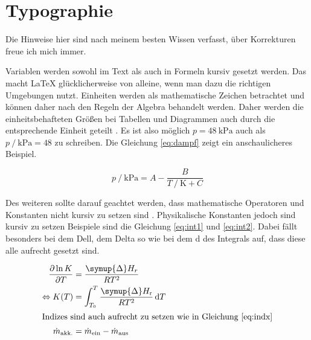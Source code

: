 	
\section{Typographie}\label{sec:typ}
Die Hinweise hier sind nach meinem besten Wissen verfasst, über Korrekturen freue ich mich immer.

Variablen werden sowohl im Text als auch in Formeln kursiv gesetzt werden.
Das macht \LaTeX{} glücklicherweise von alleine, wenn man dazu die richtigen Umgebungen nutzt.
Einheiten werden als mathematische Zeichen betrachtet und können daher nach den Regeln der Algebra behandelt werden.
Daher werden die einheitsbehafteten Größen bei Tabellen und Diagrammen auch durch die entsprechende Einheit geteilt \cite{si_brochure}.
Es ist also möglich \(p = \qty{48}{\kilo\pascal}\) auch als \(p\mathbin{/}\unit{\kilo\pascal} = 48 \) zu schreiben.	
Die Gleichung \eqref{eq:dampf} zeigt ein anschaulicheres Beispiel.

\begin{equation}\label{eq:dampf}
	p \mathbin{/} \unit{\kilo\pascal} = A - \frac{B}{T \mathbin{/} \unit{\kelvin} + C}
\end{equation}

Des weiteren sollte darauf geachtet werden, dass mathematische Operatoren und Konstanten nicht kursiv zu setzen sind \cite{green_book}. 
Physikalische Konstanten jedoch sind kursiv zu setzen Beispiele sind die Gleichung \eqref{eq:int1} und \eqref{eq:int2}.
Dabei fällt besonders bei dem Dell, dem Delta so wie bei dem d des Integrals auf, dass diese alle aufrecht gesetzt sind.

\begin{align}
	\pdv[order={1}]{\ln K}{T} &= \frac{\symup{\Delta}H_r}{RT^2} \label{eq:int1} \\
	\Leftrightarrow K(T) &= \int_{T_0}^T \frac{\symup{\Delta}H_\text{r}}{RT^2} \odif{T} \label{eq:int2} \\
	\intertext{Indizes sind auch aufrecht zu setzen wie in Gleichung \eqref{eq:indx}}
	\Dot{m} _{\text{akk.}} &= \Dot{m}_{\text{ein}} - \Dot{m} _{\text{aus}} \label{eq:indx}   
\end{align}


\newpage

\printbibliography

